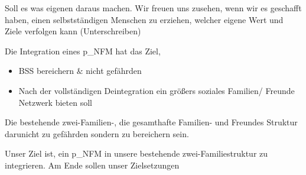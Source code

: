 \begin{itemize}
Soll es was eigenen daraus machen. 
Wir freuen uns zusehen, wenn wir es geschafft haben, einen selbstständigen Menschen zu erziehen, welcher eigene Wert und Ziele verfolgen kann (Unterschreiben)	

Die Integration eines \gls{p_NFM} hat das Ziel, 
\begin{itemize}
	\item BSS bereichern $\&$ nicht gefährden
	\item Nach der vollständigen Deintegration ein größers soziales Familien/ Freunde Netzwerk bieten soll
\end{itemize}

Die bestehende zwei-Familien-, die gesamthafte Familien- und Freundes Struktur  darunicht zu gefährden sondern zu bereichern sein.


Unser Ziel ist, ein \gls{p_NFM} in unsere bestehende zwei-Familiestruktur zu integrieren. 
Am Ende sollen unser Zielsetzungen

\end{itemize}
